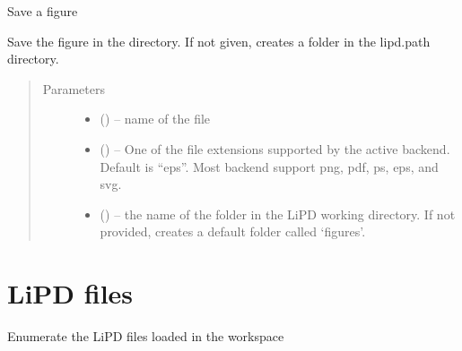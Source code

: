 \documentclass[letterpaper,10pt,english]{sphinxmanual}
\begin{document}

\begin{fulllineitems}
\label{\detokenize{LipdUtils:pyleoclim.LipdUtils.saveFigure}}
Save a figure

Save the figure in the directory. If not given, creates a folder in the
lipd.path directory.
\begin{quote}\begin{description}
\item[{Parameters}] \leavevmode\begin{itemize}
\item {} 
 () -- name of the file

\item {} 
 () -- One of the file extensions supported by the active
backend. Default is ``eps''. Most backend support png, pdf, ps, eps,
and svg.

\item {} 
 () -- the name of the folder in the LiPD working directory.
If not provided, creates a default folder called `figures'.

\end{itemize}

\end{description}\end{quote}

\end{fulllineitems}



\section{LiPD files}
\label{\detokenize{LipdUtils:lipd-files}}

\begin{fulllineitems}
\label{\detokenize{LipdUtils:pyleoclim.LipdUtils.enumerateLipds}}
Enumerate the LiPD files loaded in the workspace

\end{fulllineitems}
\end{document}
